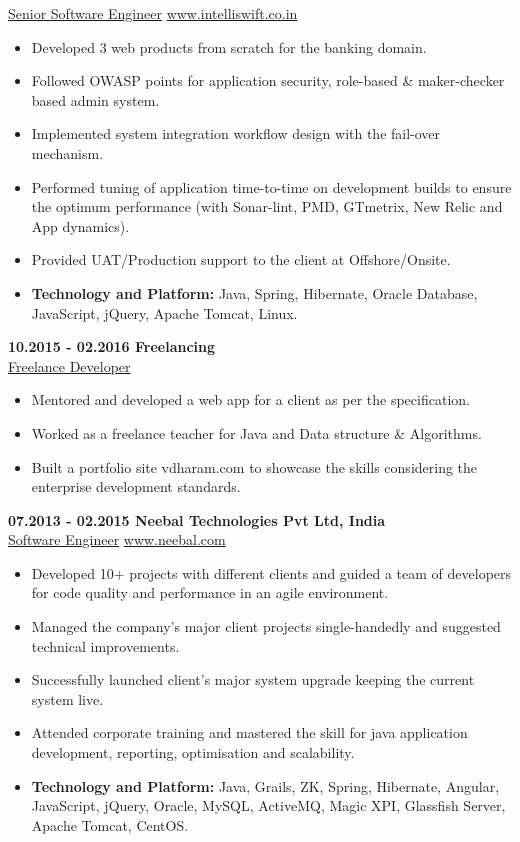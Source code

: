 \documentclass{article}
\begin{document}
\underline{Senior Software Engineer} \hfill \href{www.intelliswift.co.in}{www.intelliswift.co.in}
\begin{itemize}
	\itemsep0em
\item Developed 3 web products from scratch for the banking domain.
\item Followed OWASP points for application security, role-based \& maker-checker based admin system.
\item Implemented system integration workflow design with the fail-over mechanism.
\item Performed tuning of application time-to-time on development builds to ensure the optimum performance (with Sonar-lint, PMD, GTmetrix, New Relic and App dynamics).
\item Provided UAT/Production support to the client at Offshore/Onsite.
\item \textbf{Technology and Platform:} Java, Spring, Hibernate, Oracle Database, JavaScript, jQuery, Apache Tomcat, Linux.
\end{itemize}
\textbf{10.2015 - 02.2016 \hfill Freelancing\\}
\underline{Freelance Developer}
\begin{itemize}
	\itemsep0em
	\item Mentored and developed a web app for a client as per the specification.
	\item Worked as a freelance teacher for Java and Data structure \& Algorithms.
	\item Built a portfolio site vdharam.com to showcase the skills considering the enterprise development standards.
\end{itemize}
\textbf{07.2013 - 02.2015 \hfill Neebal Technologies Pvt Ltd, India \\}
\underline{Software Engineer} \hfill \href{www.neebal.com}{www.neebal.com}
\begin{itemize}
	\itemsep0em
	\item Developed 10+ projects with different clients and guided a team of developers for code quality and performance in an agile environment.
	\item Managed the company’s major client projects single-handedly and suggested technical improvements.
	\item Successfully launched client’s major system upgrade keeping the current system live.
	\item Attended corporate training and mastered the skill for java application development, reporting, optimisation and scalability.
	\item \textbf{Technology and Platform:} Java, Grails, ZK, Spring, Hibernate, Angular, JavaScript, jQuery, Oracle, MySQL, ActiveMQ, Magic XPI, Glassfish Server, Apache Tomcat, CentOS.
\end{itemize}
\end{document}

